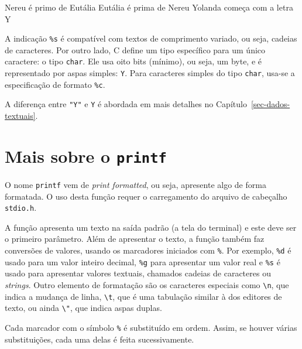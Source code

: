 \documentclass[
  11pt,
  a4paper,
]{scrbook}
\newenvironment{Shaded}{\begin{snugshade}}{\end{snugshade}}
\newcommand{\NormalTok}[1]{#1}
\begin{document}
\begin{Shaded}
\begin{Highlighting}[]
\NormalTok{Nereu é primo de Eutália}
\NormalTok{Eutália é prima de Nereu}
\NormalTok{Yolanda começa com a letra Y}
\end{Highlighting}
\end{Shaded}

 A indicação \texttt{\%s} é compatível com
textos de comprimento variado, ou seja, cadeias de caracteres. Por outro
lado, C define um tipo específico para um único caractere: o tipo
\texttt{char}. Ele usa oito bits (mínimo), ou seja, um byte, e é
representado por aspas simples:
\texttt{\textquotesingle{}Y\textquotesingle{}}. Para caracteres simples
do tipo \texttt{char}, usa-se a especificação de formato \texttt{\%c}.

A diferença entre \texttt{"Y"} e
\texttt{\textquotesingle{}Y\textquotesingle{}} é abordada em mais
detalhes no Capítulo~\ref{sec-dados-textuais}.

\section{\texorpdfstring{Mais sobre o
\texttt{printf}}{Mais sobre o printf}}\label{mais-sobre-o-printf}

O nome \texttt{printf} vem de \emph{print formatted}, ou seja, apresente
algo de forma formatada. O uso desta função requer o carregamento do
arquivo de cabeçalho \texttt{stdio.h}.

A função apresenta um texto na saída padrão (a tela do terminal) e este
deve ser o primeiro parâmetro. Além de apresentar o texto, a função
também faz conversões de valores, usando os marcadores iniciados com
\texttt{\%}. Por exemplo, \texttt{\%d} é usado para um valor inteiro
decimal, \texttt{\%g} para apresentar um valor real e \texttt{\%s} é
usado para apresentar valores textuais, chamados cadeias de caracteres
ou \emph{strings}. Outro elemento de formatação são os caracteres
especiais como \texttt{\textbackslash{}n}, que indica a mudança de
linha, \texttt{\textbackslash{}t}, que é uma tabulação similar à dos
editores de texto, ou ainda \texttt{\textbackslash{}"}, que indica aspas
duplas.

Cada marcador com o símbolo \texttt{\%} é substituído em ordem. Assim,
se houver várias substituições, cada uma delas é feita sucessivamente.
\end{document}

